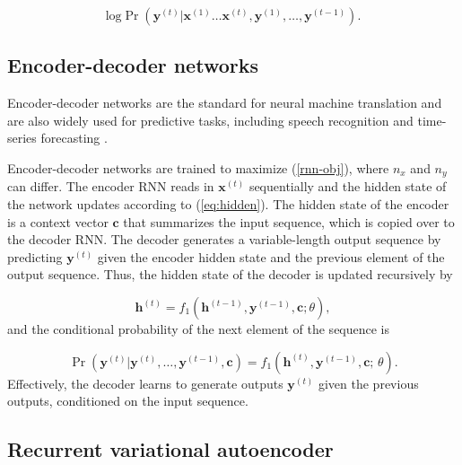 \documentclass[hidelinks,12pt]{article}
\begin{document}
\begin{equation} \label{rnn-obj}
\text{log} \Pr \left(\boldsymbol{y}^{(t)} | \boldsymbol{x}^{(1)} \ldots \boldsymbol{x}^{(t)},\boldsymbol{y}^{(1)}, \ldots, \boldsymbol{y}^{(t-1)} \right).
\end{equation}

\subsection{Encoder-decoder networks}

Encoder-decoder networks are the standard for neural machine translation \citep{cho2014learning,bahdanau2014neural,vinyals2014grammar} and are also widely used for predictive tasks, including speech recognition \citep{chorowski2015attention} and time-series forecasting \citep{zhu2017deep}. 

Encoder-decoder networks are trained to maximize (\ref{rnn-obj}), where $n_x$ and $n_y$ can differ. The encoder RNN reads in $\boldsymbol{x}^{(t)}$ sequentially and the hidden state of the network updates according to (\ref{eq:hidden}). The hidden state of the encoder is a context vector $\boldsymbol{c}$ that summarizes the input sequence, which is copied over to the decoder RNN. The decoder generates a variable-length output sequence by predicting $\boldsymbol{y}^{(t)}$ given the encoder hidden state and the previous element of the output sequence. Thus, the hidden state of the decoder is updated recursively by

\begin{equation}
\boldsymbol{h}^{(t)} = f_1 \left( \boldsymbol{h}^{(t-1)}, \boldsymbol{y}^{(t-1)}, \boldsymbol{c}; \theta \right), \label{eq:decoder}
\end{equation} and the conditional probability of the next element of the sequence is 

\begin{equation}
\Pr (\boldsymbol{y}^{(t)} | \boldsymbol{y}^{(t)}, \ldots, \boldsymbol{y}^{(t-1)}, \boldsymbol{c}) =  f_1 \left( \boldsymbol{h}^{(t)}, \boldsymbol{y}^{(t-1)}, \boldsymbol{c}; \, \theta \right).
\end{equation}  Effectively, the decoder learns to generate outputs $\boldsymbol{y}^{(t)}$ given the previous outputs, conditioned on the input sequence. 

\subsection{Recurrent variational autoencoder}
\end{document}
